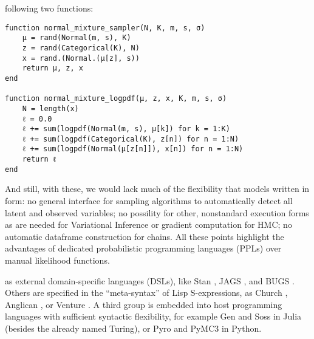following two functions:
\begin{lstlisting}
function normal_mixture_sampler(N, K, m, s, σ)
    μ = rand(Normal(m, s), K)
    z = rand(Categorical(K), N)
    x = rand.(Normal.(μ[z], s))
    return μ, z, x
end

function normal_mixture_logpdf(μ, z, x, K, m, s, σ)
    N = length(x)
    ℓ = 0.0
    ℓ += sum(logpdf(Normal(m, s), μ[k]) for k = 1:K)
    ℓ += sum(logpdf(Categorical(K), z[n]) for n = 1:N)
    ℓ += sum(logpdf(Normal(μ[z[n]]), x[n]) for n = 1:N)
    return ℓ
end
\end{lstlisting}
And still, with these, we would lack much of the flexibility that models written in \dppljl{} form:
no general interface for sampling algorithms to automatically detect all latent and observed
variables; no possility for other, nonstandard execution forms as are needed for Variational
Inference or gradient computation for HMC; no automatic dataframe construction for chains.  All
these points highlight the advantages of dedicated probabilistic programming languages (PPLs) over
manual likelihood functions.

 as external domain-specific languages (DSLs), like Stan
\parencite{carpenter2017stan}, JAGS \parencite{plummer2003jags}, and BUGS
\parencite{lunn2000winbugs,lunn2009bugs}.  Others are specified in the \enquote{meta-syntax} of Lisp
S-expressions, as Church \parencite{goodman2012church}, Anglican \parencite{wood2015new}, or Venture
\parencite{mansinghka2014venture}.  A third group is embedded into host programming languages with
sufficient syntactic flexibility, for example Gen \parencite{cusumano-towner2020gen} and Soss
\parencite{scherrer2019soss} in Julia (besides the already named Turing), or Pyro
\parencite{bingham2018pyro} and PyMC3 \parencite{salvatier2016probabilistic} in Python.

